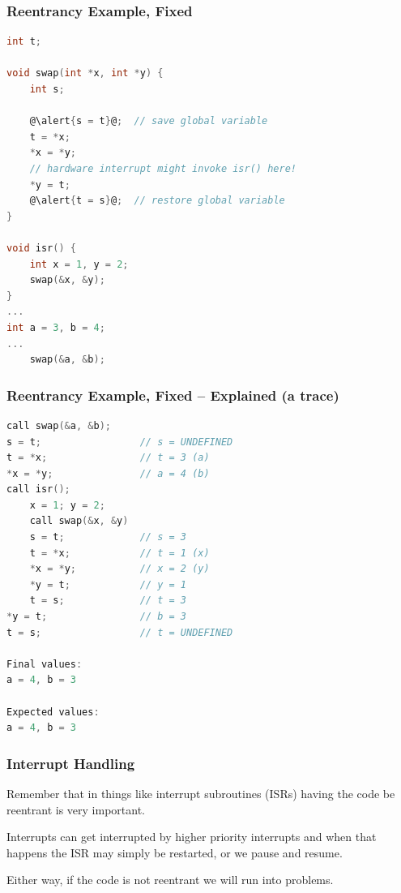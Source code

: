 \begin{frame}[fragile]
  \frametitle{Reentrancy Example, Fixed}

  
  \begin{lstlisting}[language=C,escapechar=@]
int t;
 
void swap(int *x, int *y) {
    int s;
 
    @\alert{s = t}@;  // save global variable
    t = *x;
    *x = *y;
    // hardware interrupt might invoke isr() here!
    *y = t;
    @\alert{t = s}@;  // restore global variable
}
 
void isr() {
    int x = 1, y = 2;
    swap(&x, &y);
}
...
int a = 3, b = 4;
...
    swap(&a, &b);
  \end{lstlisting}
  
\end{frame}

\begin{frame}[fragile]
  \frametitle{Reentrancy Example, Fixed -- Explained (a trace)}

  
  \begin{lstlisting}[language=C]
call swap(&a, &b);
s = t;                 // s = UNDEFINED
t = *x;                // t = 3 (a)
*x = *y;               // a = 4 (b)
call isr();
    x = 1; y = 2;
    call swap(&x, &y)
    s = t;             // s = 3
    t = *x;            // t = 1 (x)
    *x = *y;           // x = 2 (y)
    *y = t;            // y = 1
    t = s;             // t = 3
*y = t;                // b = 3
t = s;                 // t = UNDEFINED

Final values:
a = 4, b = 3

Expected values:
a = 4, b = 3
  \end{lstlisting}
  
\end{frame}

\begin{frame}
\frametitle{Interrupt Handling}


Remember that in things like interrupt subroutines (ISRs) having the code be reentrant is very important. 

Interrupts can get interrupted by higher priority interrupts and when that happens the ISR may simply be restarted, or we pause and resume.

Either way, if the code is not reentrant we will run into problems.


\end{frame}


